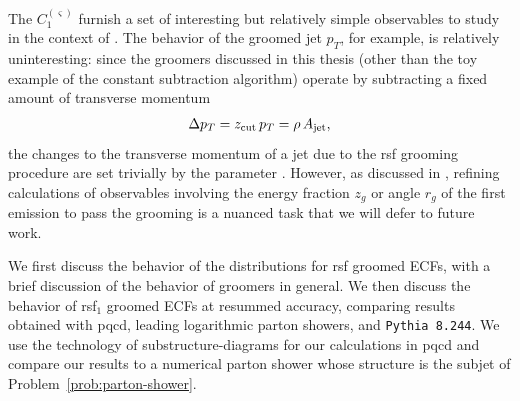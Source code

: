 The \(C_1^{(\varsigma)}\) furnish a set of interesting but relatively simple observables to study in the context of \PIRANHA{}.
%
The behavior of the \PIRANHA{} groomed jet \(p_T\), for example, is relatively uninteresting:
%
since the \PIRANHA{} groomers discussed in this thesis (other than the toy example of the constant subtraction algorithm) operate by subtracting a fixed amount of transverse momentum
\begin{align}
    \Delta p_T = z_{\rm cut}\,p_T = \rho\,A_{\rm jet}
    ,
\end{align}
the changes to the transverse momentum of a jet due to the \gls{rsf} grooming procedure are set trivially by the parameter \zcut{}.
%
However, as discussed in , refining calculations of observables involving the energy fraction \(z_g\) or angle \(r_g\) of the first emission to pass the grooming is a nuanced task that we will defer to future work.


We first discuss the  behavior of the distributions for \gls{rsf} groomed ECFs, with a brief discussion of the  behavior of \PIRANHA{} groomers in general.
%
We then discuss the behavior of \gls{rsf}\(_{1}\) groomed ECFs at resummed accuracy, comparing results obtained with \gls{pqcd}, leading logarithmic parton showers, and \texttt{Pythia 8.244}.
%
We use the technology of \glspl{substructure-diagram} for our calculations in \gls{pqcd} and compare our results to a numerical parton shower whose structure is the subjet of Problem~\ref{prob:parton-shower}.



